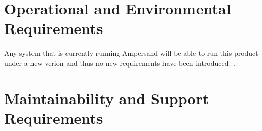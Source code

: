 %


\section{Operational and Environmental Requirements}\label{sec:Operational}
\paragraph*{}
Any system that is currently running Ampersand will be able to run this product 
under a new verion and thus no new requirements have been introduced.
.

\section{Maintainability and Support Requirements}\label{sec:Support}

